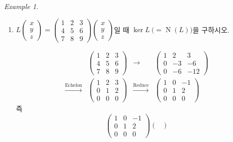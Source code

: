 \documentclass[unfonts,oneside,a4paper]{oblivoir}
\theoremstyle{definition}
\theoremstyle{theorem}
\theoremstyle{remark}
\theoremstyle{remark}
\theoremstyle{remark}
\newtheorem*{example}{Example}
\theoremstyle{remark}
\DeclareMathOperator{\Null}{N}
\begin{document}
\begin{example}
    \leavevmode
    \begin{enumerate}
        \item $L \begin{pmatrix}x \\ y \\ z\end{pmatrix} = \begin{pmatrix}1 & 2 & 3 \\ 4 & 5 & 6 \\ 7 & 8 & 9\end{pmatrix} \begin{pmatrix}x \\ y \\ z\end{pmatrix}$일 때 $\ker L\ \bigl(= \Null (L)\bigr)$을 구하시오.
            \begin{solution}
                \begin{align*}
                    &\begin{pmatrix}
                    1 & 2 & 3 \\ 4 & 5 & 6 \\ 7 & 8 & 9
                    \end{pmatrix}&\rightarrow &\begin{pmatrix}
                    1 & 2 & 3 \\ 0 & -3 & -6 \\ 0 & -6 & -12
                \end{pmatrix}\\
                \xrightarrow{\text{Echelon}} &\begin{pmatrix}
                    1 & 2 & 3 \\ 0 & 1 & 2 \\ 0 & 0 & 0
                    \end{pmatrix}&\xrightarrow{\text{Reduce}} &\begin{pmatrix}
                    1 & 0 & -1 \\ 0 & 1 & 2 \\ 0 & 0 & 0
                \end{pmatrix}
            \end{align*}
            즉
            \begin{equation*}
                \begin{pmatrix}
                    1 & 0 & -1 \\ 0 & 1 & 2 \\ 0 & 0 & 0
                    \end{pmatrix} \begin{pmatrix}

\end{pmatrix}
\end{equation*}
\end{solution}
\end{enumerate}
\end{example}
\end{document}
